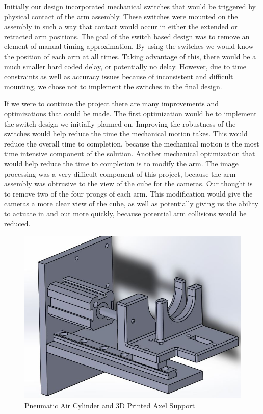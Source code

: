 \documentclass[final, letterpaper, 10 pt, conference, twocolumn]{IEEEtran}
\begin{document}
Initially our design incorporated mechanical switches that would be triggered by physical contact of the arm assembly.  These switches were mounted on the assembly in such a way that contact would occur in either the extended or retracted arm positions.  The goal of the switch based design was to remove an element of manual timing approximation.  By using the switches we would know the position of each arm at all times.  Taking advantage of this, there would be a much smaller hard coded delay, or potentially no delay.  However, due to time constraints as well as accuracy issues because of inconsistent and difficult mounting, we chose not to implement the switches in the final design.   
 
If we were to continue the project there are many improvements and optimizations that could be made. The first optimization would be to implement the switch design we initially planned on.  Improving the robustness of the switches would help reduce the time the mechanical motion takes. This would reduce the overall time to completion, because the mechanical motion is the most time intensive component of the solution. 
Another mechanical optimization that would help reduce the time to completion is to modify the arm.  The image processing was a very difficult component of this project, because the arm assembly was obtrusive to the view of the cube for the cameras.  Our thought is to remove two of the four prongs of each arm.  This modification would give the cameras a more clear view of the cube, as well as potentially giving us the ability to actuate in and out more quickly, because potential arm collisions would be reduced.

\begin{figure}[!ht]
\centering
\includegraphics[scale=0.28]{AirCylinder.jpg}
\caption{Pneumatic Air Cylinder and 3D Printed Axel Support}
\label{fig:Pneumatic Air Cylinder}
\end{figure}
\end{document}
